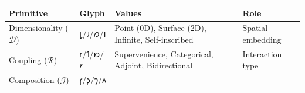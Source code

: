 \documentclass[12pt,a4paper]{article}
\begin{document}
\begin{longtable}[]{@{}llll@{}}
\toprule
\begin{minipage}[b]{0.30\columnwidth}\raggedright
Primitive\strut
\end{minipage} & \begin{minipage}[b]{0.19\columnwidth}\raggedright
Glyph\strut
\end{minipage} & \begin{minipage}[b]{0.22\columnwidth}\raggedright
Values\strut
\end{minipage} & \begin{minipage}[b]{0.17\columnwidth}\raggedright
Role\strut
\end{minipage}\tabularnewline
\midrule
\endhead
\begin{minipage}[t]{0.30\columnwidth}\raggedright
Dimensionality (\(\mathcal{D}\))\strut
\end{minipage} & \begin{minipage}[t]{0.19\columnwidth}\raggedright
𐑛/𐑨/𐑼/𐑦\strut
\end{minipage} & \begin{minipage}[t]{0.22\columnwidth}\raggedright
Point (0D), Surface (2D), Infinite, Self-inscribed\strut
\end{minipage} & \begin{minipage}[t]{0.17\columnwidth}\raggedright
Spatial embedding\strut
\end{minipage}\tabularnewline
\begin{minipage}[t]{0.30\columnwidth}\raggedright
Coupling (\(\mathcal{R}\))\strut
\end{minipage} & \begin{minipage}[t]{0.19\columnwidth}\raggedright
𐑩/𐑑/𐑽/𐑾\strut
\end{minipage} & \begin{minipage}[t]{0.22\columnwidth}\raggedright
Supervenience, Categorical, Adjoint, Bidirectional\strut
\end{minipage} & \begin{minipage}[t]{0.17\columnwidth}\raggedright
Interaction type\strut
\end{minipage}\tabularnewline
\begin{minipage}[t]{0.30\columnwidth}\raggedright
Composition (\(\mathcal{G}\))\strut
\end{minipage} & \begin{minipage}[t]{0.19\columnwidth}\raggedright
𐑝/𐑜/𐑠/𐑵\strut
\end{minipage} & \begin{minipage}[t]{0.22\columnwidth}\raggedright

\end{minipage}
\end{longtable}
\end{document}
